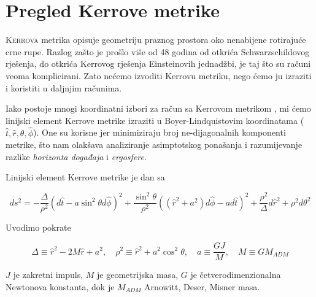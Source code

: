 \chapter{Pregled Kerrove metrike}\label{cha:Kerr}

\lettrine[lines=4]{K} {errova} metrika opisuje geometriju praznog prostora oko nenabijene rotirajuće crne rupe. Razlog zašto je prošlo više od 48 godina od otkrića Schwarzschildovog rješenja, do otkrića Kerrovog rješenja Einsteinovih jednadžbi, je taj što su računi veoma komplicirani. Zato nećemo izvoditi Kerrovu metriku, nego ćemo ju izraziti i koristiti u daljnjim računima.

Iako postoje mnogi koordinatni izbori za račun sa Kerrovom metrikom \citep{Visser:2007fj}, mi ćemo linijski element Kerrove metrike izraziti u Boyer-Lindquistovim koordinatama ($\hat{t}, \hat{r}, \theta, \hat{\phi}$). One su korisne jer minimiziraju broj ne-dijagonalnih komponenti metrike, što nam olakšava analiziranje asimptotskog ponašanja i razumijevanje razlike \emph{horizonta događaja} i \emph{ergosfere}.\medskip

\noindent Linijski element Kerrove metrike je dan sa

\begin{equation}
ds^2=-\frac{\Delta}{\rho^2}(d\hat{t}-a\sin^2\theta d\hat{\phi})^2
+\frac{\sin^2\theta}{\rho^2}\left((\hat{r}^2+a^2)d\hat{\phi}-ad\hat{t}\right)^2+\frac{\rho^2}{\Delta}d\hat{r}^2+\rho^2d\theta^2
\label{eq:KerrBoyerLindquist}
\end{equation}

\newpage

\noindent Uvodimo pokrate

\begin{equation*}
\Delta\equiv \hat{r}^2-2M\hat{r}+a^2,\quad \rho^2\equiv \hat{r}^2+a^2\cos^2\theta,\quad a\equiv \frac{GJ}{M},\quad M\equiv GM_{ADM}
\end{equation*}

\noindent $J$ je zakretni impuls, $M$ je geometrijska masa, $G$ je četverodimenzionalna Newtonova konstanta, dok je $M_{ADM}$ Arnowitt, Deser, Misner masa.

